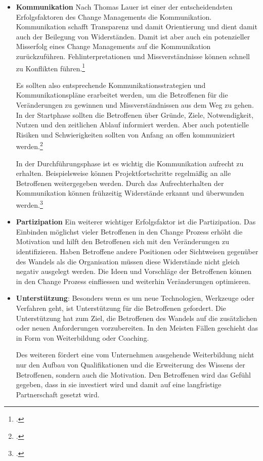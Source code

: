 \begin{itemize}
\item \textbf{Kommunikation}
Nach Thomas Lauer ist einer der entscheidendsten Erfolgsfaktoren des Change Managements die Kommunikation. Kommunikation schafft Transparenz und damit Orientierung und dient damit auch der Beilegung von Widerständen. Damit ist aber auch ein potenzieller Misserfolg eines Change Managements auf die Kommunikation zurückzuführen. Fehlinterpretationen und Missverständnisse können schnell zu Konflikten führen.\footcite{lauer_change_2014}

Es sollten also entsprechende Kommunikationsstrategien und Kommunikationspläne erarbeitet werden, um die Betroffenen für die Veränderungen zu gewinnen und Missverständnissen aus dem Weg zu gehen. In der Startphase sollten die Betroffenen über Gründe, Ziele, Notwendigkeit, Nutzen und den zeitlichen Ablauf informiert werden. Aber auch potentielle Risiken und Schwierigkeiten sollten von Anfang an offen kommuniziert werden.\footcite{fisch_veraenderungen_2008}

In der Durchführungsphase ist es wichtig die Kommunikation aufrecht zu erhalten. Beispielsweise können Projektfortschritte regelmäßig an alle Betroffenen weitergegeben werden. Durch das Aufrechterhalten der Kommunikation können frühzeitig Widerstände erkannt und überwunden werden.\footcite{lauer_change_2014}

\item \textbf{Partizipation}
Ein weiterer wichtiger Erfolgsfaktor ist die Partizipation. Das Einbinden möglichst vieler Betroffenen in den Change Prozess erhöht die Motivation und hilft den Betroffenen sich mit den Veränderungen zu identifizieren. Haben Betroffene andere Positionen oder Sichtweisen gegenüber des Wandels als die Organisation müssen diese Widerstände nicht gleich negativ ausgelegt werden. Die Ideen und Vorschläge der Betroffenen können in den Change Prozess einfliessen und weiterhin Veränderungen optimieren.

\item \textbf{Unterstützung}:
Besonders wenn es um neue Technologien, Werkzeuge oder Verfahren geht, ist Unterstützung für die Betroffenen gefordert. Die Unterstützung hat zum Ziel, die Betroffenen des Wandels auf die zusätzlichen oder neuen Anforderungen vorzubereiten. In den Meisten Fällen geschieht das in Form von Weiterbildung oder Coaching.

Des weiteren fördert eine vom Unternehmen ausgehende Weiterbildung nicht nur den Aufbau von Qualifikationen und die Erweiterung des Wissens der Betroffenen, sondern auch die Motivation. Den Betroffenen wird das Gefühl gegeben, dass in sie investiert wird und damit auf eine langfristige Partnerschaft gesetzt wird.
\end{itemize}

